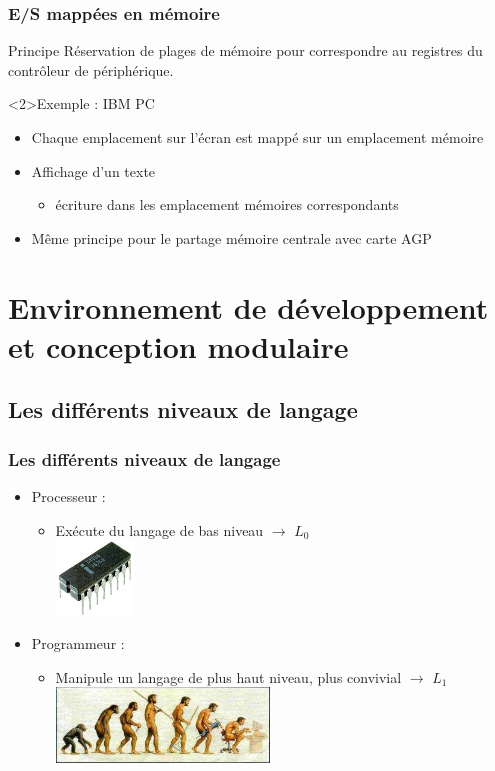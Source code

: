 \begin{frame}
\frametitle{E/S mappées en mémoire}
\begin{block}{Principe}
Réservation de plages de mémoire pour correspondre au registres du contrôleur de périphérique.
\end{block}

\begin{exampleblock}<2>{Exemple : IBM PC}
\begin{itemize}
\item Chaque emplacement sur l’écran est mappé sur un emplacement mémoire
\item Affichage d’un texte
\begin{itemize}
\item écriture dans les emplacement mémoires correspondants
\end{itemize}
\item Même principe pour le partage mémoire centrale avec carte AGP
\end{itemize}
\end{exampleblock}
\end{frame}


\section{Environnement de développement et conception modulaire}

\subsection{Les différents niveaux de langage}
\begin{frame}
\frametitle{Les différents niveaux de langage}
\begin{itemize}
\item Processeur : 
\begin{itemize}
\item Exécute du langage de bas niveau $\rightarrow$ $L_0$ \\
\includegraphics[height=2cm]{../illustration/Intel4004.jpg}
\end{itemize}
\item Programmeur :
\begin{itemize}
\item Manipule un langage de plus haut niveau, plus convivial $\rightarrow$ $L_1$ \\
\includegraphics[height=2cm]{../illustration/evolution.jpg}
\end{itemize}
\end{itemize}
\end{frame}

